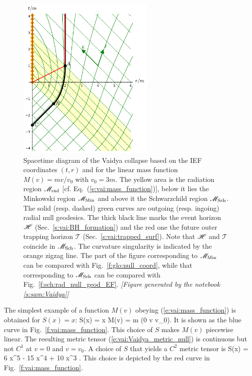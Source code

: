 \begin{figure}
\centerline{\includegraphics[width=0.6\textwidth]{vai_diag_S0.pdf}}
\caption[]{\label{f:vai:diag_S0} \footnotesize
Spacetime diagram of the Vaidya collapse based on the IEF coordinates $(t, r)$
and for the linear mass function $M(v)=m v/v_0$ with $v_0 = 3 m$.
The yellow area is the radiation region $\mathscr{M}_{\rm rad}$
[cf. Eq.~(\ref{e:vai:mass_function})],
below it lies the Minkowski region $\mathscr{M}_{\rm Min}$
and above it the Schwarzchild region $\mathscr{M}_{\rm Sch}$.
The solid (resp. dashed) green curves are outgoing (resp. ingoing) radial
null geodesics. The thick black line marks the event horizon $\mathscr{H}$ (Sec.~\ref{s:vai:BH_formation}) and
the red one the future outer trapping horizon $\mathscr{T}$ (Sec.~\ref{s:vai:trapped_surf}).
Note that $\mathscr{H}$ and $\mathscr{T}$ coincide in $\mathscr{M}_{\rm Sch}$.
The curvature singularity
is indicated by the orange zigzag line. The part of the figure corresponding
to $\mathscr{M}_{\rm Min}$ can be compared with Fig.~\ref{f:glo:null_coord},
while that corresponding to $\mathscr{M}_{\rm Sch}$ can be
compared with Fig.~\ref{f:sch:rad_null_geod_EF}.
\textsl{[Figure generated by the notebook \ref{s:sam:Vaidya}]}
}
\end{figure}


The simplest example of a function $M(v)$
obeying (\ref{e:vai:mass_function}) is obtained for $S(x) = x$:
\be \label{e:vai:S_linear}
     S(x) = x \quad \iff \quad M(v) = m  \quad (0 \leq v \leq v_0).
\ee
It is shown as the blue curve in Fig.~\ref{f:vai:mass_function}.
This choice of $S$ makes $M(v)$ piecewise linear. The resulting metric tensor
(\ref{e:vai:Vaidya_metric_null}) is continuous but not $C^1$ at $v=0$ and $v=v_0$. A choice
of $S$ that yields a $C^2$ metric tensor is
\be
    S(x) = 6 x^5 - 15 x^4 + 10 x^3 .
\ee
This choice is depicted by the red curve in Fig.~\ref{f:vai:mass_function}.

